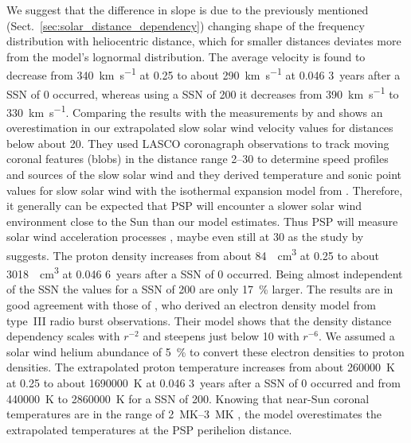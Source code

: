 We suggest that the difference in slope is due to the previously mentioned (Sect.~\ref{sec:solar_distance_dependency}) changing shape of the frequency distribution with heliocentric distance, which for smaller distances deviates more from the model’s lognormal distribution.
The average velocity is found to decrease from \SI{340}{\km\per\s} at \SI{0.25}{\au} to about \SI{290}{\km\per\s} at \SI{0.046}{\au} 3~years after a SSN of 0 occurred, whereas using a SSN of 200 it decreases from \SI{390}{\km\per\s} to \SI{330}{\km\per\s}. Comparing the results with the measurements by \citet{Sheeley1997} and \citet{Wang2000} shows an overestimation in our extrapolated slow solar wind velocity values for distances below about \SI{20}{\Rs}. They used LASCO coronagraph observations to track moving coronal features (blobs) in the distance range \SIrange{2}{30}{\Rs} to determine speed profiles and sources of the slow solar wind and they derived temperature and sonic point values for slow solar wind with the isothermal expansion model from \citet{Parker1958}. Therefore, it generally can be expected that PSP will encounter a slower solar wind environment close to the Sun than our model estimates. Thus PSP will measure solar wind acceleration processes \citep{McComas2008}, maybe even still at \SI{30}{\Rs} as the study by \citet{Sheeley1997} suggests.
The proton density increases from about \SI{84}{\per\cm\cubed} at \SI{0.25}{\au} to about \SI{3018}{\per\cm\cubed} at \SI{0.046}{\au} 6~years after a SSN of 0 occurred. Being almost independent of the SSN the values for a SSN of 200 are only \SI{17}{\%} larger. The results are in good agreement with those of \citet{Leblanc1998}, who derived an electron density model from type~III radio burst observations. Their model shows that the density distance dependency scales with $r^{-2}$ and steepens just below \SI{10}{\Rs} with $r^{-6}$. We assumed a solar wind helium abundance of \SI{5}{\%} to convert these electron densities to proton densities.
The extrapolated proton temperature increases from about \SI{260000}{\K} at \SI{0.25}{\au} to about \SI{1690000}{\K} at \SI{0.046}{\au} 3~years after a SSN of 0 occurred and from \SI{440000}{\K} to \SI{2860000}{\K} for a SSN of 200. Knowing that near-Sun coronal temperatures are in the range of \SIrange{2}{3}{\mega\K} \citep{Billings1959,Liebenberg1975}, the model overestimates the extrapolated temperatures at the PSP perihelion distance.

